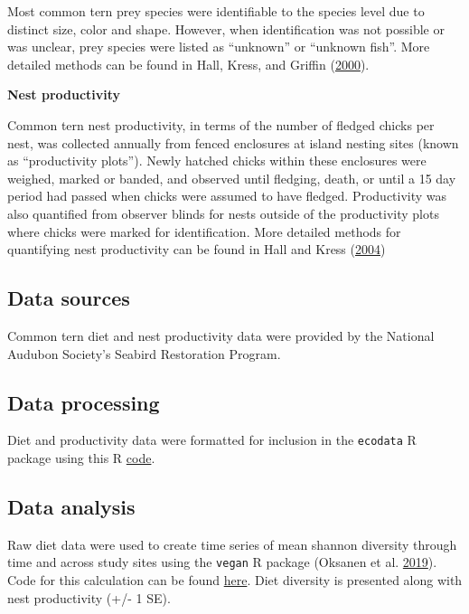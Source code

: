 \documentclass[
]{book}
\begin{document}
Most common tern prey species were identifiable to the species level due to distinct size, color and shape. However, when identification was not possible or was unclear, prey species were listed as ``unknown'' or ``unknown fish''. More detailed methods can be found in Hall, Kress, and Griffin (\protect\hyperlink{ref-hall2000}{2000}).

\textbf{Nest productivity}

Common tern nest productivity, in terms of the number of fledged chicks per nest, was collected annually from fenced enclosures at island nesting sites (known as ``productivity plots''). Newly hatched chicks within these enclosures were weighed, marked or banded, and observed until fledging, death, or until a 15 day period had passed when chicks were assumed to have fledged. Productivity was also quantified from observer blinds for nests outside of the productivity plots where chicks were marked for identification. More detailed methods for quantifying nest productivity can be found in Hall and Kress (\protect\hyperlink{ref-hall2004}{2004})

\hypertarget{data-sources-32}{%
\subsection{Data sources}\label{data-sources-32}}

Common tern diet and nest productivity data were provided by the National Audubon Society's Seabird Restoration Program.

\hypertarget{data-processing-23}{%
\subsection{Data processing}\label{data-processing-23}}

Diet and productivity data were formatted for inclusion in the \texttt{ecodata} R package using this R \href{https://github.com/NOAA-EDAB/ecodata/blob/master/data-raw/get_commontern.R}{code}.

\hypertarget{data-analysis-30}{%
\subsection{Data analysis}\label{data-analysis-30}}

Raw diet data were used to create time series of mean shannon diversity through time and across study sites using the \texttt{vegan} R package (Oksanen et al. \protect\hyperlink{ref-R-vegan}{2019}). Code for this calculation can be found \href{https://github.com/NOAA-EDAB/tech-doc/blob/master/R/stored_scripts/seabird_ne_div_analysis.R}{here}. Diet diversity is presented along with nest productivity (+/- 1 SE).
\end{document}
